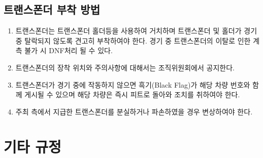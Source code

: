 \documentclass[final,a4paper,10pt]{report}
\begin{document}
\section{트랜스폰더 부착 방법}\label{rule:formula-technical.transponder-mounting}
\begin{enumerate}
  \item\label{rule:formula-technical.transponder-mounting.secure-holder-mounting} 트랜스폰더는 트랜스폰더 홀더{\color{blue}등을} 사용하여 거치하며 트랜스폰더 및 홀더가 경기 중 탈락되지 않도록 견고히 부착하여야 한다. 경기 중 트랜스폰더의 이탈로 인한 계측 불가 시 DNF처리 될 수 있다.
  \item\label{rule:formula-technical.transponder-mounting.location-notice-by-organizer} {\color{blue}트랜스폰더의 장착 위치와 주의사항에 대해서는 조직위원회에서 공지한다.}
  \item\label{rule:formula-technical.transponder-mounting.malfunction-black-flag} 트랜스폰더가 경기 중에 작동하지 않으면 흑기(Black Flag)가 해당 차량 번호와 함께 게시될 수 있으며 해당 차량은 즉시 피트로 돌아와 조치를 취하여야 한다.
  \item\label{rule:formula-technical.transponder-mounting.loss-or-damage-compensation} 주최 측에서 지급한 트랜스폰더를 분실하거나 파손하였을 경우 변상하여야 한다.
\end{enumerate}

\chapter{기타 규정}
\end{document}
